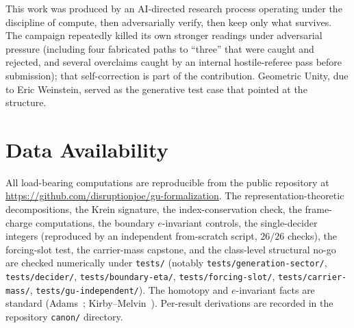 \documentclass[11pt]{article}
\theoremstyle{definition}
\theoremstyle{remark}
\begin{document}
This work was produced by an AI-directed research process operating under the discipline of compute, then
adversarially verify, then keep only what survives. The campaign repeatedly killed its own stronger readings
under adversarial pressure (including four fabricated paths to ``three'' that were caught and rejected, and
several overclaims caught by an internal hostile-referee pass before submission); that self-correction is part of
the contribution. Geometric Unity, due to Eric Weinstein, served as the generative test case that pointed at the
structure.

\section*{Data Availability}

All load-bearing computations are reproducible from the public repository at
\url{https://github.com/disruptionjoe/gu-formalization}. The representation-theoretic decompositions, the Krein
signature, the index-conservation check, the frame-charge computations, the boundary $e$-invariant controls, the
single-decider integers (reproduced by an independent from-scratch script, $26/26$ checks), the forcing-slot
test, the carrier-mass capstone, and the class-level structural no-go are checked numerically under
\texttt{tests/} (notably \texttt{tests/generation-sector/}, \texttt{tests/decider/},
\texttt{tests/boundary-eta/}, \texttt{tests/forcing-slot/}, \texttt{tests/carrier-mass/},
\texttt{tests/gu-independent/}). The homotopy and $e$-invariant facts are standard
(Adams~\cite{adams1966jx4}; Kirby--Melvin~\cite{kirbymelvin1999}). Per-result derivations are recorded in the
repository \texttt{canon/} directory.
\end{document}
